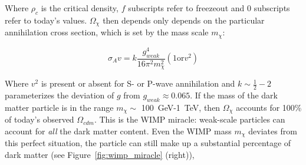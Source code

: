 Where $\rho_{c}$ is the critical density, $f$ subscripts refer to freezeout and $0$ subscripts refer to today's values. $\Omega_{\chi}$ then depends only depends on the particular annihilation cross section, which is set by the mass scale $m_{\chi}$:

\begin{equation}
\label{eq:sigmav}
\sigma_{A}v = k \frac{g_{weak}^{4}}{16 \pi^{2}m_{\chi}^{2}} ( \mathrm{1 or} v^{2} ) 
\end{equation}

Where $v^{2}$ is present or absent for S- or P-wave annihilation and $k \sim \frac{1}{2} - 2$ parameterizes the deviation of $g$ from $g_{weak} \approx 0.065$. If the mass of the dark matter particle is in the range $m_{\chi} \sim$ 100~GeV-1~TeV, then $\Omega_{\chi}$ accounts for 100\% of today's observed $\Omega_{cdm}$. This is the \ac{WIMP} miracle: weak-scale particles can account for \textit{all} the dark matter content. Even the \ac{WIMP} mass $m_{\chi}$ deviates from this perfect situation, the particle can still make up a substantial percentage of dark matter (see Figure~\ref{fig:wimp_miracle} (right)),


